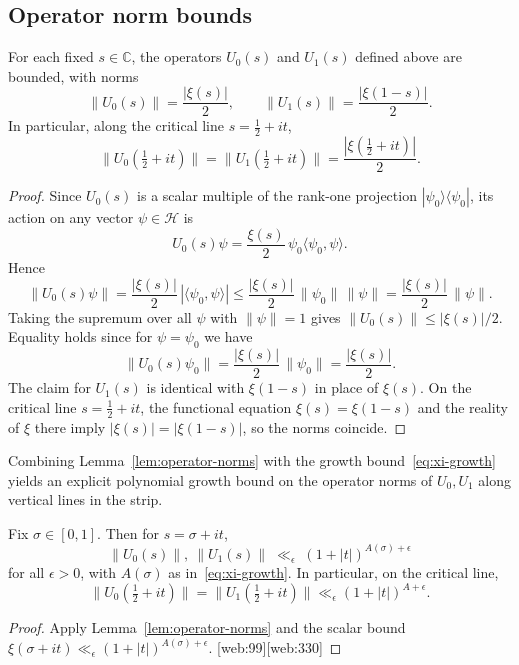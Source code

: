 \documentclass[11pt]{article}
\begin{document}
\subsection{Operator norm bounds}

\begin{lemma}\label{lem:operator-norms}
For each fixed $s\in\mathbb{C}$, the operators $U_0(s)$ and $U_1(s)$ defined above are bounded, with norms
\[
  \|U_0(s)\| = \frac{|\xi(s)|}{2}, \qquad
  \|U_1(s)\| = \frac{|\xi(1-s)|}{2}.
\]
In particular, along the critical line $s=\frac12+it$,
\[
  \|U_0(\tfrac12+it)\| = \|U_1(\tfrac12+it)\| = \frac{|\xi(\tfrac12+it)|}{2}.
\]
\end{lemma}

\begin{proof}
Since $U_0(s)$ is a scalar multiple of the rank-one projection $|\psi_0\rangle\langle\psi_0|$, its action on any vector $\psi\in \mathcal{H}$ is
\[
  U_0(s)\psi = \frac{\xi(s)}{2}\,\psi_0\langle\psi_0,\psi\rangle.
\]
Hence
\[
  \|U_0(s)\psi\| = \frac{|\xi(s)|}{2}\,|\langle\psi_0,\psi\rangle|
  \le \frac{|\xi(s)|}{2}\,\|\psi_0\|\,\|\psi\|
  = \frac{|\xi(s)|}{2}\,\|\psi\|.
\]
Taking the supremum over all $\psi$ with $\|\psi\|=1$ gives $\|U_0(s)\|\le |\xi(s)|/2$.  Equality holds since for $\psi=\psi_0$ we have
\[
  \|U_0(s)\psi_0\|
  = \frac{|\xi(s)|}{2}\,\|\psi_0\| = \frac{|\xi(s)|}{2}.
\]
The claim for $U_1(s)$ is identical with $\xi(1-s)$ in place of $\xi(s)$.  On the critical line $s=\tfrac12+it$, the functional equation $\xi(s)=\xi(1-s)$ and the reality of $\xi$ there imply $|\xi(s)|=|\xi(1-s)|$, so the norms coincide.
\end{proof}

Combining Lemma~\ref{lem:operator-norms} with the growth bound~\eqref{eq:xi-growth} yields an explicit polynomial growth bound on the operator norms of $U_0,U_1$ along vertical lines in the strip.

\begin{corollary}\label{cor:U-growth}
Fix $\sigma\in[0,1]$.  Then for $s=\sigma+it$,
\[
  \|U_0(s)\|,\ \|U_1(s)\| \;\ll_\epsilon\; (1+|t|)^{A(\sigma)+\epsilon}
\]
for all $\epsilon>0$, with $A(\sigma)$ as in~\eqref{eq:xi-growth}.  In particular, on the critical line,
\[
  \|U_0(\tfrac12+it)\| = \|U_1(\tfrac12+it)\|
  \ll_\epsilon (1+|t|)^{A+\epsilon}.
\]
\end{corollary}

\begin{proof}
Apply Lemma~\ref{lem:operator-norms} and the scalar bound $\xi(\sigma+it)\ll_\epsilon(1+|t|)^{A(\sigma)+\epsilon}$. [web:99][web:330]
\end{proof}
\end{document}
